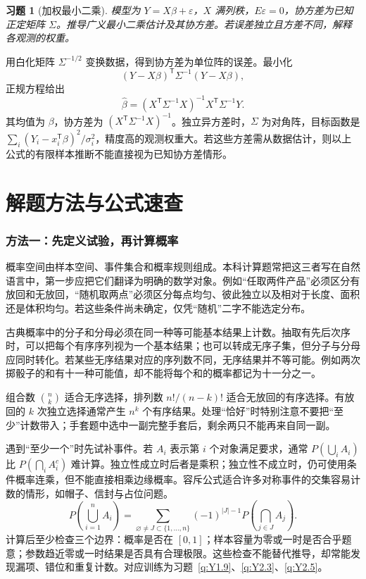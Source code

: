 \documentclass[UTF8,12pt,a4paper,fontset=fandol]{ctexart}
\newtheorem{exercise}{习题}[section]
\begin{document}
\begin{exercise}[加权最小二乘]\label{q:B17.24}
模型为 $Y=X\beta+\varepsilon$，$X$ 满列秩，$E\varepsilon=0$，协方差为已知正定矩阵 $\Sigma$。推导广义最小二乘估计及其协方差。若误差独立且方差不同，解释各观测的权重。\par{}
\end{exercise}

\begin{solve}\label{a:B17.24}用白化矩阵 $\Sigma^{-1/2}$ 变换数据，得到协方差为单位阵的误差。最小化\[(Y-X\beta)^\mathsf T\Sigma^{-1}(Y-X\beta),\]正规方程给出\[\widehat\beta=(X^\mathsf T\Sigma^{-1}X)^{-1}X^\mathsf T\Sigma^{-1}Y.\]其均值为 $\beta$，协方差为 $(X^\mathsf T\Sigma^{-1}X)^{-1}$。独立异方差时，$\Sigma$ 为对角阵，目标函数是 $\sum_i(Y_i-x_i^\mathsf T\beta)^2/\sigma_i^2$，精度高的观测权重大。若这些方差需从数据估计，则以上公式的有限样本推断不能直接视为已知协方差情形。\end{solve}

\clearpage
\part{解题方法与公式速查}
\section*{方法一：先定义试验，再计算概率}
概率空间由样本空间、事件集合和概率规则组成。本科计算题常把这三者写在自然语言中，第一步应把它们翻译为明确的数学对象。例如“任取两件产品”必须区分有放回和无放回，“随机取两点”必须区分每点均匀、彼此独立以及相对于长度、面积还是体积均匀。若这些条件尚未确定，仅凭“随机”二字不能选定分布。

古典概率中的分子和分母必须在同一种等可能基本结果上计数。抽取有先后次序时，可以把每个有序序列视为一个基本结果；也可以转成无序子集，但分子与分母应同时转化。若某些无序结果对应的序列数不同，无序结果并不等可能。例如两次掷骰子的和有十一种可能值，却不能将每个和的概率都记为十一分之一。

组合数 $\binom nk$ 适合无序选择，排列数 $n!/(n-k)!$ 适合无放回的有序选择。有放回的 $k$ 次独立选择通常产生 $n^k$ 个有序结果。处理“恰好”时特别注意不要把“至少”计数带入；手套题中选中一副完整手套后，剩余两只不能再来自同一副。

遇到“至少一个”时先试补事件。若 $A_i$ 表示第 $i$ 个对象满足要求，通常 $P(\bigcup_iA_i)$ 比 $P(\bigcap_iA_i^c)$ 难计算。独立性成立时后者是乘积；独立性不成立时，仍可使用条件概率连乘，但不能直接相乘边缘概率。容斥公式适合许多对称事件的交集容易计数的情形，如帽子、信封与占位问题。
\begin{equation*}
P\left(\bigcup_{i=1}^nA_i\right)
=\sum_{\varnothing\ne J\subset\{1,\ldots,n\}}(-1)^{|J|-1}P\left(\bigcap_{j\in J}A_j\right).
\end{equation*}
计算后至少检查三个边界：概率是否在 $[0,1]$；样本容量为零或一时是否合乎题意；参数趋近零或一时结果是否具有合理极限。这些检查不能替代推导，却常能发现漏项、错位和重复计数。对应训练为习题~\ref{q:Y1.9}、\ref{q:Y2.3}、\ref{q:Y2.5}。
\end{document}
